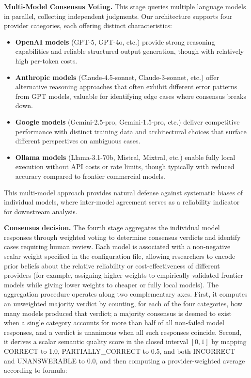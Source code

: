 \documentclass[]{einformatica}
\begin{document}
\textbf{Multi-Model Consensus Voting.} This stage queries multiple language models in parallel, collecting independent judgments. Our architecture supports four provider categories, each offering distinct characteristics:

\begin{itemize}
\item \textbf{OpenAI models} (GPT-5, GPT-4o, etc.) provide strong reasoning capabilities and reliable structured output generation, though with relatively high per-token costs.
\item \textbf{Anthropic models} (Claude-4.5-sonnet, Claude-3-sonnet, etc.) offer alternative reasoning approaches that often exhibit different error patterns from GPT models, valuable for identifying edge cases where consensus breaks down.
\item \textbf{Google models} (Gemini-2.5-pro, Gemini-1.5-pro, etc.) deliver competitive performance with distinct training data and architectural choices that surface different perspectives on ambiguous cases.
\item \textbf{Ollama models} (Llama-3.1-70b, Mistral, Mixtral, etc.) enable fully local execution without API costs or rate limits, though typically with reduced accuracy compared to frontier commercial models.
\end{itemize}

This multi-model approach provides natural defense against systematic biases of individual models, where inter-model agreement serves as a reliability indicator for downstream analysis.

\textbf{Consensus decision.} The fourth stage aggregates the individual model responses through weighted voting to determine consensus verdicts and identify cases requiring human review. Each model is associated with a non-negative scalar weight specified in the configuration file, allowing researchers to encode prior beliefs about the relative reliability or cost-effectiveness of different providers (for example, assigning higher weights to empirically validated frontier models while giving lower weights to cheaper or fully local models). The aggregation procedure operates along two complementary axes. First, it computes an unweighted majority verdict by counting, for each of the four categories, how many models produced that verdict; a majority consensus is deemed to exist when a single category accounts for more than half of all non-failed model responses, and a verdict is unanimous when all such responses coincide. Second, it derives a scalar semantic quality score in the closed interval $[0,1]$ by mapping CORRECT to 1.0, PARTIALLY\_CORRECT to 0.5, and both INCORRECT and UNANSWERABLE to 0.0, and then computing a provider-weighted average according to formula:
\end{document}
